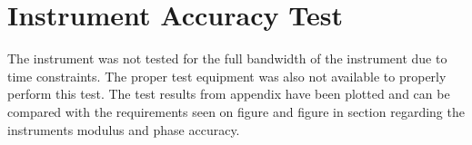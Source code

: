 \section{Instrument Accuracy Test} \label{subsec:8_1_AccTest}
The instrument was not tested for the full bandwidth of the instrument due to time constraints. The proper test equipment was also not available to properly perform this test. The test results from appendix  have been plotted and can be compared with the requirements seen on figure  and figure  in section  regarding the instruments modulus and phase accuracy.

